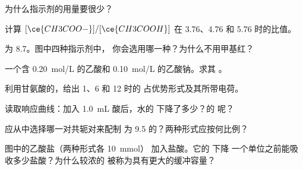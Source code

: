 \begin{exercise}[$\star$]\label{exo:g12:buffers-predominance:5}
为什么指示剂的用量要很少？
\end{exercise}

\begin{exercise}[$\star\star$]\label{exo:g12:buffers-predominance:6}
计算 $[\ce{CH3COO-}]/[\ce{CH3COOH}]$ 在  3.76、4.76 和
5.76 时的比值。
\end{exercise}

\begin{exercise}[$\star\star$]\label{exo:g12:buffers-predominance:7}
为  8.7。图中四种指示剂中，
你会选用哪一种？为什么不用甲基红？
\end{exercise}

\begin{exercise}[$\star\star$]\label{exo:g12:buffers-predominance:8}
一个含 \qty{0.20}{mol/L} 的乙酸和
\qty{0.10}{mol/L} 的乙酸钠。求其 。
\end{exercise}

\begin{exercise}[$\star\star$]\label{exo:g12:buffers-predominance:9}
利用甘氨酸的，给出  1、6 和 12 时的
占优势形式及其所带电荷。
\end{exercise}

\begin{exercise}[$\star\star$]\label{exo:g12:buffers-predominance:10}
读取响应曲线：加入
\qty{1.0}{mL} 酸后，水的  下降了多少？的  呢？
\end{exercise}

\begin{exercise}[$\star\star$]\label{exo:g12:buffers-predominance:11}
应从中选择哪一对共轭对来配制
 为 9.5 的？两种形式应按何比例？
\end{exercise}

\begin{exercise}[$\star\star\star$]\label{exo:g12:buffers-predominance:12}
图中的乙酸盐（两种形式各 \qty{10}{mmol}）
加入盐酸。它的  下降
一个单位之前能吸收多少盐酸？为什么较浓的
被称为具有更大的缓冲容量？
\end{exercise}

